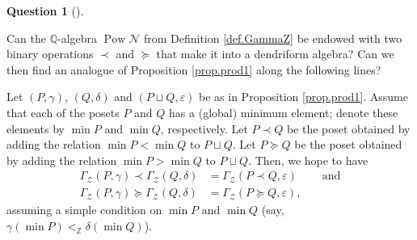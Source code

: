 \documentclass[numbers=enddot,12pt,final,onecolumn,notitlepage]{scrartcl}%
\theoremstyle{definition}
\newtheorem{quest}[theo]{Question}
\newenvironment{question}[1][]
{\begin{quest}[#1]\begin{leftbar}}
{\end{leftbar}\end{quest}}
\newenvironment{question}[1][Question]{\noindent\textbf{#1.} }{\ \rule{0.5em}{0.5em}}
\newenvironment{vershort}{}{}
\newcommand{\ZZ}{\mathbb{Z}}
\begin{document}
\begin{vershort}
\begin{question}
Can the $\mathbb{Q}$-algebra $\operatorname*{Pow}\mathcal{N}$ from Definition
\ref{def.GammaZ} be endowed with two binary operations $\left.  \prec\right.
$ and $\left.  \succeq\right.  $ that make it into a dendriform algebra? Can
we then find an analogue of Proposition \ref{prop.prod1} along the following lines?

Let $\left(  P,\gamma\right)  $, $\left(  Q,\delta\right)  $ and $\left(
P\sqcup Q,\varepsilon\right)  $ be as in Proposition \ref{prop.prod1}. Assume
that each of the posets $P$ and $Q$ has a (global) minimum element; denote these
elements by $\min P$ and $\min Q$, respectively.
Let $P \left. \prec \right. Q$ be the poset obtained by adding
the relation $\min P<\min Q$ to $P\sqcup Q$.
Let $P \left. \succeq \right. Q$ be the poset obtained by adding
the relation $\min P>\min Q$ to $P\sqcup Q$.
Then, we hope to have%
\begin{align*}
\Gamma_{\mathcal{Z}}\left(  P,\gamma\right)  \left.  \prec\right.
\Gamma_{\mathcal{Z}}\left(  Q,\delta\right)   &  =\Gamma_{\mathcal{Z}}\left(
P\left.  \prec\right.  Q,\varepsilon\right)  \ \ \ \ \ \ \ \ \ \ \text{and}\\
\Gamma_{\mathcal{Z}}\left(  P,\gamma\right)  \left.  \succeq\right.
\Gamma_{\mathcal{Z}}\left(  Q,\delta\right)   &  =\Gamma_{\mathcal{Z}}\left(
P\left.  \succeq\right.  Q,\varepsilon\right)  ,
\end{align*}
assuming a simple condition on $\min P$ and $\min Q$
(say, $\gamma\left(\min P\right) <_{\ZZ} \delta\left(\min Q\right)$).
\end{question}
\end{vershort}
\end{document}

